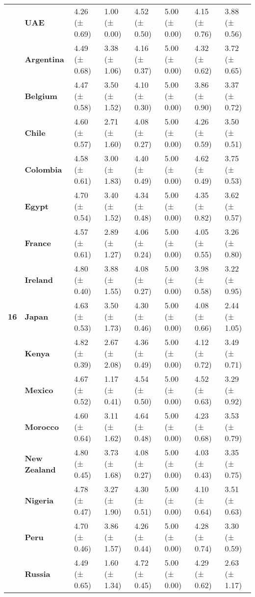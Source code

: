 \begin{longtable}{llllllll}
\textbf{} & \textbf{UAE} & 4.26 (± 0.69) & 1.00 (± 0.00) & 4.52 (± 0.50) & 5.00 (± 0.00) & 4.15 (± 0.76) & 3.88 (± 0.56) \\
\cline{1-8}
\multirow[t]{19}{*}{\textbf{16}} & \textbf{Argentina} & 4.49 (± 0.68) & 3.38 (± 1.06) & 4.16 (± 0.37) & 5.00 (± 0.00) & 4.32 (± 0.62) & 3.72 (± 0.65) \\
\textbf{} & \textbf{Belgium} & 4.47 (± 0.58) & 3.50 (± 1.52) & 4.10 (± 0.30) & 5.00 (± 0.00) & 3.86 (± 0.90) & 3.37 (± 0.72) \\
\textbf{} & \textbf{Chile} & 4.60 (± 0.57) & 2.71 (± 1.60) & 4.08 (± 0.27) & 5.00 (± 0.00) & 4.26 (± 0.59) & 3.50 (± 0.51) \\
\textbf{} & \textbf{Colombia} & 4.58 (± 0.61) & 3.00 (± 1.83) & 4.40 (± 0.49) & 5.00 (± 0.00) & 4.62 (± 0.49) & 3.75 (± 0.53) \\
\textbf{} & \textbf{Egypt} & 4.70 (± 0.54) & 3.40 (± 1.52) & 4.34 (± 0.48) & 5.00 (± 0.00) & 4.35 (± 0.82) & 3.62 (± 0.57) \\
\textbf{} & \textbf{France} & 4.57 (± 0.61) & 2.89 (± 1.27) & 4.06 (± 0.24) & 5.00 (± 0.00) & 4.05 (± 0.55) & 3.26 (± 0.80) \\
\textbf{} & \textbf{Ireland} & 4.80 (± 0.40) & 3.88 (± 1.55) & 4.08 (± 0.27) & 5.00 (± 0.00) & 3.98 (± 0.58) & 3.22 (± 0.95) \\
\textbf{} & \textbf{Japan} & 4.63 (± 0.53) & 3.50 (± 1.73) & 4.30 (± 0.46) & 5.00 (± 0.00) & 4.08 (± 0.66) & 2.44 (± 1.05) \\
\textbf{} & \textbf{Kenya} & 4.82 (± 0.39) & 2.67 (± 2.08) & 4.36 (± 0.49) & 5.00 (± 0.00) & 4.12 (± 0.72) & 3.49 (± 0.71) \\
\textbf{} & \textbf{Mexico} & 4.67 (± 0.52) & 1.17 (± 0.41) & 4.54 (± 0.50) & 5.00 (± 0.00) & 4.52 (± 0.63) & 3.29 (± 0.92) \\
\textbf{} & \textbf{Morocco} & 4.60 (± 0.64) & 3.11 (± 1.62) & 4.64 (± 0.48) & 5.00 (± 0.00) & 4.23 (± 0.68) & 3.53 (± 0.79) \\
\textbf{} & \textbf{New Zealand} & 4.80 (± 0.45) & 3.73 (± 1.68) & 4.08 (± 0.27) & 5.00 (± 0.00) & 4.03 (± 0.43) & 3.35 (± 0.75) \\
\textbf{} & \textbf{Nigeria} & 4.78 (± 0.47) & 3.27 (± 1.90) & 4.30 (± 0.51) & 5.00 (± 0.00) & 4.10 (± 0.64) & 3.51 (± 0.63) \\
\textbf{} & \textbf{Peru} & 4.70 (± 0.46) & 3.86 (± 1.57) & 4.26 (± 0.44) & 5.00 (± 0.00) & 4.28 (± 0.74) & 3.30 (± 0.59) \\
\textbf{} & \textbf{Russia} & 4.49 (± 0.65) & 1.60 (± 1.34) & 4.72 (± 0.45) & 5.00 (± 0.00) & 4.29 (± 0.62) & 2.63 (± 1.17) \\

\end{longtable}
